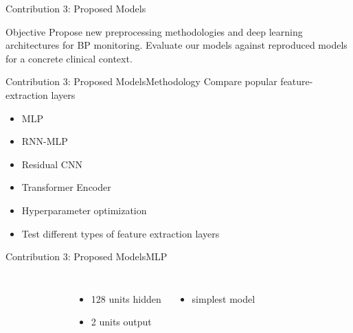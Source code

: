 \begin{frame}{Contribution 3: Proposed Models}
    \begin{block}{Objective}
        Propose new preprocessing methodologies and deep learning architectures for BP monitoring.
        Evaluate our models against reproduced models for a concrete clinical context.
    \end{block}
\end{frame}

\begin{frame}{Contribution 3: Proposed Models}{Methodology}
    Compare popular feature-extraction layers
    \begin{itemize}
        \item MLP
        \item RNN-MLP
        \item Residual CNN
        \item Transformer Encoder
    \end{itemize}

    \begin{itemize}
        \item Hyperparameter optimization
        \item Test different types of feature extraction layers
    \end{itemize}
\end{frame}

\begin{frame}{Contribution 3: Proposed Models}{MLP}
    \begin{columns}
        \begin{figure}
            
        \end{figure}

        \begin{itemize}
            \item 128 units hidden
            \item 2 units output
        \end{itemize}
        \begin{itemize}
            \item simplest model
        \end{itemize}
    \end{columns}

\end{frame}

